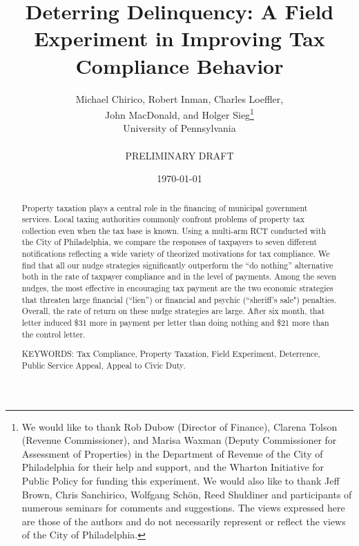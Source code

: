 \documentclass[12pt]{article}
\renewcommand{\thefootnote}{\fnsymbol{footnote}}
\begin{document}
\title{Deterring Delinquency: A Field Experiment in Improving Tax Compliance Behavior}

\author{Michael Chirico, Robert Inman, Charles Loeffler, \\ John
  MacDonald, and Holger Sieg\thanks{We would like to thank Rob Dubow
    (Director of Finance), Clarena Tolson (Revenue Commissioner), and
    Marisa Waxman (Deputy Commissioner for Assessment of Properties)
    in the Department of Revenue of the City of Philadelphia for their
    help and support, and the Wharton Initiative for Public Policy for
    funding this experiment. We would also like to thank Jeff Brown,
    Chris Sanchirico, Wolfgang Sch\"on, Reed Shuldiner and
    participants of numerous seminars for comments and
    suggestions. The views expressed here are those of the authors and
    do not necessarily represent or reflect the views of the City of
    Philadelphia.}  \\ University of Pennsylvania \\
    \\
    PRELIMINARY DRAFT}

\date{\today}

\maketitle

\begin{abstract}

Property taxation plays a central role in the financing of municipal government services. Local taxing authorities commonly confront problems of property tax collection even when the tax base is known.  Using a multi-arm RCT conducted with the City of Philadelphia, we compare the responses of taxpayers to seven different notifications
reflecting a wide variety of theorized motivations for tax compliance. We find that  all our nudge strategies significantly outperform the ``do nothing'' alternative both in the rate of taxpayer compliance and in the level of payments.  Among the seven nudges, the most effective in encouraging tax payment are the two economic strategies that threaten large financial (``lien'') or financial and psychic (``sheriff's sale") penalties.  Overall, the rate of return on these nudge strategies are large. After six month, that letter induced \$31 more in payment per letter than doing nothing and \$21 more than the control letter.

\noindent KEYWORDS: Tax Compliance, Property Taxation, Field
Experiment, Deterrence, Public Service Appeal, Appeal to Civic Duty.

\end{abstract}
\renewcommand{\thefootnote}{\arabic{footnote}}
\end{document}

